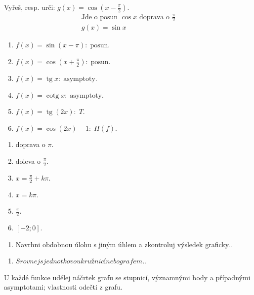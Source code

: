 \documentclass[11pt,a4paper]{article}
\begin{document}
\begin{prikladReseniBox}[title={Příklad 2}]
Vyřeš, resp. urči: $g(x)=\cos\left(x-\frac{\pi}{2}\right)$.
\tcblower
\[\begin{aligned}\text{Jde o posun }\cos x\text{ doprava o }\frac{\pi}{2} \\ g(x)=\sin x\end{aligned}\]
\end{prikladReseniBox}
\begin{zadaniReseniBox}[title={Samostatná práce 1}]
\begin{enumerate}[label=\alph*)]
\item $f(x)=\sin(x-\pi):\;\text{posun}$.
\item $f(x)=\cos(x+\frac{\pi}{2}):\;\text{posun}$.
\item $f(x)=\operatorname{tg}x:\;\text{asymptoty}$.
\item $f(x)=\operatorname{cotg}x:\;\text{asymptoty}$.
\item $f(x)=\operatorname{tg}(2x):\;T$.
\item $f(x)=\cos(2x)-1:\;H(f)$.
\end{enumerate}
\tcblower
\begin{enumerate}[label=\alph*)]
\item doprava o $\pi$.
\item doleva o $\frac{\pi}{2}$.
\item $x=\frac{\pi}{2}+k\pi$.
\item $x=k\pi$.
\item $\frac{\pi}{2}$.
\item $[-2;0]$.
\end{enumerate}
\end{zadaniReseniBox}
\begin{zadaniReseniBox}[title={Rozšíření 1}]
\begin{enumerate}[label=\alph*)]
\item Navrhni obdobnou úlohu s jiným úhlem a zkontroluj výsledek graficky..
\end{enumerate}
\tcblower
\begin{enumerate}[label=\alph*)]
\item $Srovnej s jednotkovou kružnicí nebo grafem.$.
\end{enumerate}
\end{zadaniReseniBox}
U každé funkce udělej náčrtek grafu se stupnicí, významnými body a případnými asymptotami; vlastnosti odečti z grafu.
\end{document}
